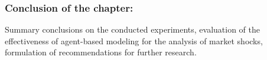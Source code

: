 \subsubsection{Conclusion of the chapter:}

Summary conclusions on the conducted experiments, evaluation of the effectiveness of agent-based modeling for the analysis of market shocks, formulation of recommendations for further research.
